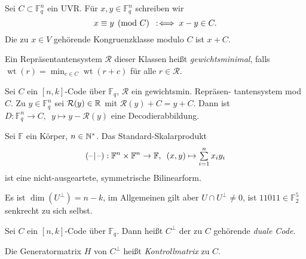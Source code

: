 \documentclass{cheat-sheet}
\newcommand{\F}{\mathbb{F}} %
\DeclareMathOperator{\wt}{wt} %
\newcommand{\scp}[2]{\left( #1 \!\mid\! #2 \right)} %
\begin{document}

\begin{nota}
  Sei $C \subset \F_q^n$ ein UVR. Für $x, y \in \F_q^n$ schreiben wir
  \[ x \equiv y \pmod{C} \enspace:\!\iff x-y \in C. \]
  Die zu $x \in V$ gehörende Kongruenzklasse modulo $C$ ist $x + C$.
\end{nota}

\begin{defn}
  Ein Repräsentantensystem $\mathcal{R}$ dieser Klassen heißt \emph{gewichtsminimal}, falls $\wt(r) = \min_{c \in C} \wt(r+c)$ für alle $r \in \mathcal{R}$.
\end{defn}

\begin{satz}
  Sei $C$ ein $[n, k]$-Code über $\F_q$, $\mathcal{R}$ ein gewichtsmin. Repräsen- tantensystem mod $C$.
  Zu $y \in \F_q^n$ sei $\mathcal{R}(y) \in \mathbb{R}$ mit $\mathcal{R}(y) + C = y + C$.
  Dann ist $D : \F_q^n \to C, \enspace y \mapsto y - \mathcal{R}(y)$ eine Decodierabbildung.
\end{satz}




\begin{bem}
  Sei $\F$ ein Körper, $n \in \mathbb{N}^*$.
  Das Standard-Skalarprodukt
  \[
    \scp{\blank}{\blank} : \F^n \times \F^n \to \F,
    \enspace (x, y) \mapsto \sum_{i=1}^n x_i y_i
  \]
  ist eine nicht-ausgeartete, symmetrische Bilinearform.
\end{bem}


\begin{acht}
  Es ist $\dim(U^\perp) = n - k$, im Allgemeinen gilt aber $U \cap U^\perp \neq 0$, \zB{} ist $11011 \in \F_2^5$ senkrecht zu sich selbst.
\end{acht}

\begin{defn}
  Sei $C$ ein $[n,k]$-Code über $\F_q$.
  Dann heißt $C^\perp$ der zu $C$ gehörende \emph{duale Code}.
\end{defn}

\begin{defn}
  Die Generatormatrix $H$ von $C^\perp$ heißt \emph{Kontrollmatrix} zu $C$.
\end{defn}
\end{document}
